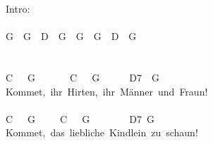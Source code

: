 \documentclass[]{book}
\begin{document}
Intro:\\
~\\
G~~G~~D~~G~~G~~G~~D~~G\\
~\\
~\\
\hspace*{0.333em}\hspace*{0.333em}\hspace*{0.333em}\hspace*{0.333em}\hspace*{0.333em}\hspace*{0.333em}\hspace*{0.333em}\hspace*{0.333em}C~~~G~~~~~~~C~~~G~~~~~~D7~~G\\
Kommet,~ihr~Hirten,~ihr~Männer~und~Fraun!\\
~\\
\hspace*{0.333em}\hspace*{0.333em}\hspace*{0.333em}\hspace*{0.333em}\hspace*{0.333em}\hspace*{0.333em}\hspace*{0.333em}\hspace*{0.333em}C~~~G~~~~~C~~~G~~~~~~~~D7~G\\
Kommet,~das~liebliche~Kindlein~zu~schaun!\\
~\\
\end{document}
